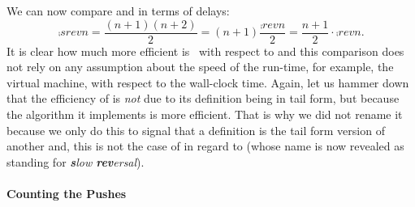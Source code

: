 We can now compare  and  in terms of
delays:
\[
\comp{srev}{n} = \frac{(n+1)(n+2)}{2} = (n+1)\frac{\comp{rev}{n}}{2} =
\frac{n+1}{2} \cdot \comp{rev}{n}.
\]
It is clear how much more efficient is~ with respect
to  and this comparison does not rely on any
assumption about the speed of the \Erlang run\hyp{}time, for example,
the virtual machine, with respect to the wall\hyp{}clock time. Again,
let us hammer down that the efficiency of  is
\emph{not} due to its definition being in tail form, but because the
algorithm it implements is more efficient. That is why we did not
rename it~ because we only do this to signal that a
definition is the tail form version of another and, this is not the
case of  in regard to  (whose name is
now revealed as standing for \emph{\textbf{s}low \textbf{rev}ersal}).

\medskip

\paragraph{Counting the Pushes}
\label{counting_the_pushes}

